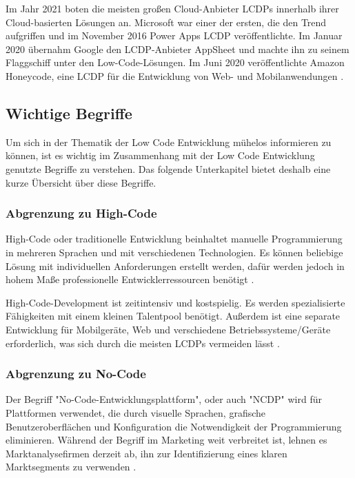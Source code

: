 \documentclass[12pt]{article} %
\begin{document}
	Im Jahr 2021 boten die meisten großen Cloud-Anbieter LCDPs innerhalb ihrer Cloud-basierten Lösungen an. Microsoft war einer der ersten, die den Trend aufgriffen und im November 2016 Power Apps LCDP veröffentlichte. Im Januar 2020 übernahm Google den LCDP-Anbieter AppSheet und machte ihn zu seinem Flaggschiff unter den Low-Code-Lösungen. Im Juni 2020 veröffentlichte Amazon Honeycode, eine LCDP für die Entwicklung von Web- und Mobilanwendungen \cite{DiRuscio.2022}.
	
	\subsection{Wichtige Begriffe}
	Um sich in der Thematik der Low Code Entwicklung mühelos informieren zu können, ist es wichtig im Zusammenhang mit der Low Code Entwicklung genutzte Begriffe zu verstehen. Das folgende Unterkapitel bietet deshalb eine kurze Übersicht über diese Begriffe.
	
	\subsubsection{Abgrenzung zu High-Code}
	High-Code oder traditionelle Entwicklung beinhaltet manuelle Programmierung in mehreren Sprachen und mit verschiedenen Technologien. Es können beliebige Lösung mit individuellen Anforderungen erstellt werden, dafür werden jedoch in hohem Maße professionelle Entwicklerressourcen benötigt \cite{Mendix.2023}. \newline
	
	High-Code-Development ist zeitintensiv und kostspielig. Es werden spezialisierte Fähigkeiten mit einem kleinen Talentpool benötigt. Außerdem ist eine separate Entwicklung für Mobilgeräte, Web und verschiedene Betriebssysteme/Geräte erforderlich, was sich durch die meisten LCDPs vermeiden lässt \cite{Mendix.2023}. 
	
	\subsubsection{Abgrenzung zu No-Code}
	Der Begriff "No-Code-Entwicklungsplattform", oder auch "NCDP" wird für Plattformen verwendet, die durch visuelle Sprachen, grafische Benutzeroberflächen und Konfiguration die Notwendigkeit der Programmierung eliminieren. Während der Begriff im Marketing weit verbreitet ist, lehnen es Marktanalysefirmen derzeit ab, ihn zur Identifizierung eines klaren Marktsegments zu verwenden \cite{DiRuscio.2022}.
	
\end{document}
